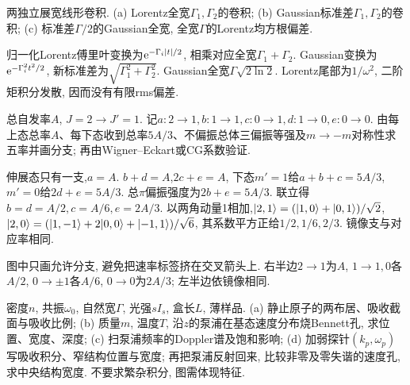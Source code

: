 \begin{exercise}两独立展宽线形卷积. (a) Lorentz全宽$\Gamma_1,\Gamma_2$的卷积; (b) Gaussian标准差$\Gamma_1,\Gamma_2$的卷积; (c) 标准差$\Gamma/2$的Gaussian全宽, 全宽$\Gamma$的Lorentz均方根偏差.\end{exercise}
\begin{solution}归一化Lorentz傅里叶变换为$\mathrm e^{-\Gamma_i|t|/2}$, 相乘对应全宽$\Gamma_1+\Gamma_2$. Gaussian变换为$\mathrm e^{-\Gamma_i^2t^2/2}$, 新标准差为$\sqrt{\Gamma_1^2+\Gamma_2^2}$. Gaussian全宽$\Gamma\sqrt{2\ln2}$. Lorentz尾部为$1/\omega^2$, 二阶矩积分发散, 因而没有有限rms偏差.
\end{solution}
\begin{exercise}总自发率$A$, $J=2\to J'=1$. 记$a:2\to1,b:1\to1,c:0\to1,d:1\to0,e:0\to0$. 由每上态总率$A$、每下态收到总率$5A/3$、不偏振总体三偏振等强及$m\to-m$对称性求五率并画分支; 再由Wigner--Eckart或CG系数验证.\end{exercise}
\begin{solution}伸展态只有一支,$a=A$. $b+d=A$,$2c+e=A$, 下态$m'=1$给$a+b+c=5A/3$, $m'=0$给$2d+e=5A/3$. 总$\pi$偏振强度为$2b+e=5A/3$. 联立得$b=d=A/2,c=A/6,e=2A/3$. 以两角动量1相加,$\lvert 2,1\rangle=(\lvert 1,0\rangle+\lvert 0,1\rangle)/\sqrt2$, $\lvert 2,0\rangle=(\lvert 1,-1\rangle+2\lvert 0,0\rangle+\lvert -1,1\rangle)/\sqrt6$, 其系数平方正给$1/2,1/6,2/3$. 镜像支与对应率相同.
\begin{center}\end{center}
图中只画允许分支, 避免把速率标签挤在交叉箭头上. 右半边$2\to1$为$A$, $1\to1,0$各$A/2$, $0\to\pm1$各$A/6$, $0\to0$为$2A/3$; 左半边依镜像相同.
\end{solution}
\begin{exercise}密度$n$, 共振$\omega_0$, 自然宽$\Gamma$, 光强$sI_s$, 盒长$L$, 薄样品. (a) 静止原子的两布居、吸收截面与吸收比例; (b) 质量$m$, 温度$T$, 沿$z$的泵浦在基态速度分布烧Bennett孔, 求位置、宽度、深度; (c) 扫泵浦频率的Doppler谱及饱和影响; (d) 加弱探针$(k_p,\omega_p)$写吸收积分、窄结构位置与宽度; 再把泵浦反射回来, 比较非零及零失谐的速度孔, 求中央结构宽度. 不要求繁杂积分, 图需体现特征.\end{exercise}
